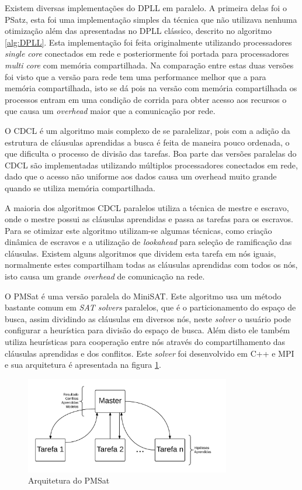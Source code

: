 \documentclass{ufsc-thesis}
\begin{document}
Existem diversas implementações do DPLL em paralelo. A primeira delas foi o PSatz\cite{Jurkowiak2005}, esta 
foi uma implementação simples da técnica que não utilizava nenhuma otimização além 
das apresentadas no DPLL clássico, descrito no algoritmo \ref{alg:DPLL}. Esta implementação 
foi feita originalmente utilizando processadores \textit{single core} conectados em rede 
e posteriormente foi portada para processadores \textit{multi core} com memória compartilhada\cite{holldobler2011short}.
Na comparação entre estas duas versões foi visto que a versão para rede tem uma performance 
melhor que a para memória compartilhada, isto se dá pois na versão 
com memória compartilhada os processos entram em uma condição de corrida para obter acesso 
aos recursos o que causa um \textit{overhead} maior que a comunicação por rede.

O CDCL é um algoritmo mais complexo de se paralelizar, pois com a adição da estrutura de 
cláusulas aprendidas a busca é feita de maneira pouco ordenada, o que dificulta o processo 
de divisão das tarefas. Boa parte das versões paralelas do CDCL são implementadas 
utilizando múltiplos processadores conectados em rede, dado que o acesso não uniforme 
aos dados causa um overhead muito grande quando se utiliza memória compartilhada. 

A maioria dos algoritmos CDCL paralelos utiliza a técnica de mestre e escravo, onde 
o mestre possui as cláusulas aprendidas e passa as tarefas para os escravos. Para se 
otimizar este algoritmo utilizam-se algumas técnicas, como criação dinâmica de escravos e 
a utilização de \textit{lookahead} para seleção de ramificação das cláusulas. Existem 
alguns algoritmos que dividem esta tarefa em nós iguais, normalmente estes compartilham 
todas as cláusulas aprendidas com todos os nós, isto causa um grande 
\textit{overhead} de comunicação na rede.

O PMSat\cite{Gil_pmsat} é uma versão paralela do MiniSAT\cite{Sorensson02minisat}. 
Este algoritmo usa um método bastante comum 
em \textit{SAT solvers} paralelos, que é o particionamento do espaço de busca, assim 
dividindo as cláusulas em diversos nós, neste \textit{solver} o usuário pode configurar 
a heurística para divisão do espaço de busca. Além disto ele também utiliza heurísticas para 
cooperação entre nós através do compartilhamento das cláusulas aprendidas e dos conflitos.
Este \textit{solver} foi desenvolvido em C++ e MPI e sua arquitetura é apresentada na figura \ref{fig:PMSat}.

\begin{figure}[H]
    \centering
    \includegraphics[width=0.8\textwidth]{figuras/PMSat.jpeg}
    \caption{Arquitetura do PMSat}
    \label{fig:PMSat}
\end{figure}
\end{document}
